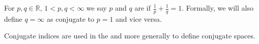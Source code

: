 \documentclass[12pt]{article}
\newcommand{\reals}{\mathbb{R}}
\begin{document}
For $p,q \in \reals$, $1<p,q<\infty$ we say $p$ and $q$ are \emph{} if $\frac{1}{p} + \frac{1}{q} = 1$.  Formally, we will also define $q = \infty$ as conjugate to $p=1$ and vice versa.

Conjugate indices are used in the  and more generally to define conjugate spaces.
\end{document}
